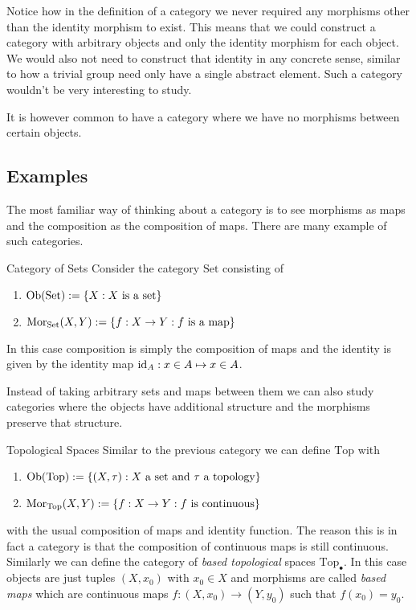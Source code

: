Notice how in the definition of a category we never required any morphisms other than the identity morphism to exist. This means that we could construct a category with arbitrary objects and only the identity morphism for each object. We would also not need to construct that identity in any concrete sense, similar to how a trivial group need only have a single abstract element.
Such a category wouldn't be very interesting to study.

It is however common to have a category where we have no morphisms between certain objects.

\subsection{Examples}

The most familiar way of thinking about a category is to see morphisms as maps and the composition as the composition of maps. There are many example of such categories.

\begin{example}{Category of Sets}{}
Consider the category $\mathrm{Set}$ consisting of
\begin{enumerate}
    \item $\mathrm {Ob}(\mathrm{Set}) := \{X: \text{$X$ is a set}\}$
    \item $\mathrm {Mor}_{\mathrm{Set}}(X,Y) := \{f: X \to Y: \text{$f$ is a map}\}$
\end{enumerate}
In this case composition is simply the composition of maps and the identity is given by the identity map $\mathrm{id}_A: x \in A \mapsto x \in A$.
\end{example}

Instead of taking arbitrary sets and maps between them we can also study categories where the objects have additional structure and the morphisms preserve that structure.

\begin{example}{Topological Spaces}{}
Similar to the previous category we can define $\mathrm{Top}$ with
\begin{enumerate}
    \item $\mathrm {Ob}(\mathrm{Top}) := \{(X,\tau) : \text{$X$ a set and $\tau$ a topology}\}$
    \item $\mathrm {Mor}_{\mathrm{Top}}(X,Y) := \{f: X \to Y: \text{$f$ is continuous}\}$
\end{enumerate}
with the usual composition of maps and identity function.
The reason this is in fact a category is that the composition of continuous maps is still continuous.\\

Similarly we can define the category of \emph{based topological} spaces $\mathrm{Top}_\bullet$. In this case objects are just tuples $(X,x_0)$ with $x_0 \in X$ and morphisms are called \emph{based maps} which are continuous maps $f: (X,x_0) \to (Y,y_0)$ such that $f(x_0) = y_0$.
\end{example}

